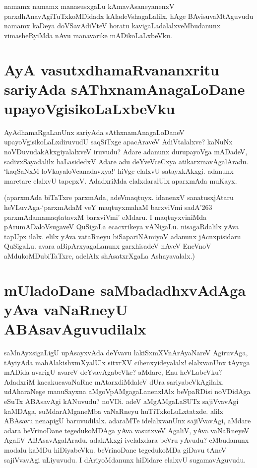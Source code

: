 namamx namamx manasusxgaLu kAmavAsaneyanenxV parxdhAnavAgiTuTxkoMDidadx kAladeVshagaLalilx, hAge BAvisuvaMtAguvudu namamx kaDeya doVSavAdiVteV horatu kavigaLadalalxveMbudanunx vimasheRyiMda nAvu manavarike mADikoLaLxbeVku.

\section*{AyA vasutxdhamaRvananxritu sariyAda sAThxnamAnagaLoDane upayoVgisikoLaLxbeVku}

AyAdhamaRgaLanUnx sariyAda sAthxnamAnagaLoDaneV upayoVgisikoLaLxdiruvudU saqSiTxge apacAraveV AdiVtalalxve? kaNuNx noVDuvudakAkxgiyalalxveV iruvudu? Adare adanunx durupayoVga mADadeV, sadivxSayadalilx baLasidedxV Adare adu deYveVceCxya atikarxmavAgalAradu. `kaqSaNxM loVkayaloVcanadavxya!' hiVge elalxvU satayxkAkxgi. adanunx maretare elalxvU tapepxV. AdadxriMda elalxdaralUlx aparxmAda muKayx.

(aparxmAda biTaTxre parxmAda, adeVmaqtuyx. idanenxV sanatusxjAtaru heVLuvAga-`parxmAdaM veY maqtuyxmahaM\label{126} barxviVmi sadA\char'263 parxmAdamamaqtatavxM barxviVmi' eMdaru. I maqtuyxviniMda pArumADaloVsugaveV QuSigaLa ecacxrikeya vANigaLu. nisagaRdalilx yAva tapUpx ilalx. elilx yAva vataRneyu biSapariNAmiyoV adanunx jAcnxpisidaru QuSigaLu. avara aBipArxyagaLanunx garxhisadeV nAveV EneVnoV aMdukoMDubiTaTxre, adelAlx shAsatxrXgaLa Ashayavalalx.)

\section*{mUladoDane saMbadadhxvAdAga yAva vaNaRneyU ABAsavAguvudilalx}

saMnAyxsigaLigU upAsayxvAda deYvavu lakiSxmXVnArAyaNareV AgiruvAga, tAyiyAda mahAlakishxmXyalUlx sitxrXV cihenxyideyalalx! elalxvanUnx tAyxga mADida avarigU avareV deYvavAgabeVke? aMdare, Enu heVLabeVku? AdadxriM kacakucavaNaRne mAtarxdiMdaleV dUra sariyabeVkAgilalx. udAharaNege manuSayxna aMgoVpAMgagaLanenxlAlx beVpaRDisi noVDidAga eSuTx ABAsavAgi kANuvudu? noVDi. adeV aMgAMgaLaSUTx sajiVvavAgi kaMDAga, suMdarAMganeMba vaNaRneyu huTiTxkoLuLxtatxde. alilx ABAsavu nenapigU baruvudilalx. adaraMTe idelalxvanUnx sajiVvavAgi, aMdare adara beVrinoDane tegedukoMDAga yAva vasutxveV AgaliV, yAva vaNaRneyeV AgaliV ABAsavAgalAradu. adakAkxgi ivelalxdara beVru yAvudu? eMbudanunx modalu kaMDu hiDiyabeVku. beVrinoDane tegedukoMDa giDavu tAneV sajiVvavAgi uLiyuvudu. I dAriyoMdanunx hiDidare elalxvU sugamavAguvudu.


